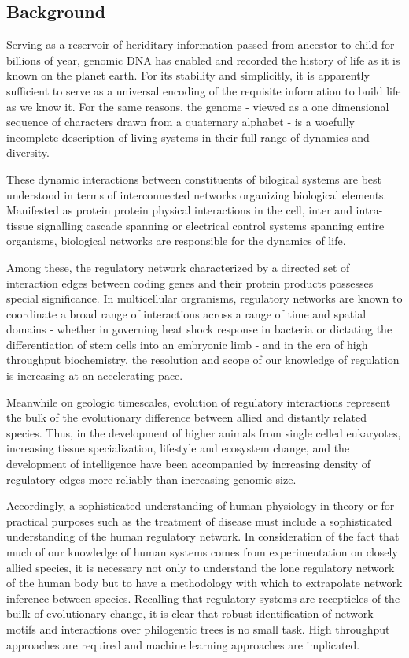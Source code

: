 \documentclass[12pt,a4paper]{article}
\begin{document}
\begin{multicols}{2}


\section{Background}


Serving as a reservoir of heriditary information passed from ancestor to child for billions of year, genomic DNA has enabled and recorded the history of life as it is known on the planet earth. For its stability and simplicitly, it is apparently sufficient to serve as a universal encoding of the requisite information to build life as we know it. For the same reasons, the genome - viewed as a one dimensional sequence of characters drawn from a quaternary alphabet - is a woefully incomplete description of living systems in their full range of dynamics and diversity.


These dynamic interactions between constituents of bilogical systems are best understood in terms of interconnected networks organizing biological elements. Manifested as protein protein physical interactions in the cell, inter and intra-tissue signalling cascade spanning or electrical control systems spanning entire organisms, biological networks are responsible for the dynamics of life.

Among these, the regulatory network characterized by a directed set of interaction edges between coding genes and their protein products possesses special significance. In multicellular orgranisms, regulatory networks are known to coordinate a broad range of interactions across a range of time and spatial domains - whether in governing heat shock response in bacteria or dictating the differentiation of stem cells into an embryonic limb - and in the era of high throughput biochemistry, the resolution and scope of our knowledge of regulation is increasing at an accelerating pace.

Meanwhile on geologic timescales, evolution of regulatory interactions represent the bulk of the evolutionary difference between allied and distantly related species. Thus, in the development of higher animals from single celled eukaryotes, increasing tissue specialization, lifestyle and ecosystem change, and the development of intelligence have been accompanied by increasing density of regulatory edges more reliably than increasing genomic size.

Accordingly, a sophisticated understanding of human physiology in theory or for practical purposes such as the treatment of disease must include a sophisticated understanding of the human regulatory network. In consideration of the fact that much of our knowledge of human systems comes from experimentation on closely allied species, it is necessary not only to understand the lone regulatory network of the human body but to have a methodology with which to extrapolate network inference between species. Recalling that regulatory systems are recepticles of the builk of evolutionary change, it is clear that robust identification of network motifs and interactions over philogentic trees is no small task. High throughput approaches are required and machine learning approaches are implicated.


\end{multicols}
\end{document}
